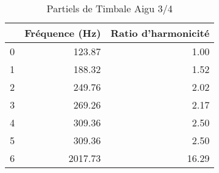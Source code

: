\begin{table}
\centering
\caption{Partiels de Timbale Aigu 3/4}
\label{table:partiels-timbale-aigu-3.wav}
\begin{tabular}{lrr}
\toprule
{} &  Fréquence (Hz) &  Ratio d'harmonicité \\
\midrule
0 &          123.87 &                 1.00 \\
1 &          188.32 &                 1.52 \\
2 &          249.76 &                 2.02 \\
3 &          269.26 &                 2.17 \\
4 &          309.36 &                 2.50 \\
5 &          309.36 &                 2.50 \\
6 &         2017.73 &                16.29 \\
\bottomrule
\end{tabular}
\end{table}
